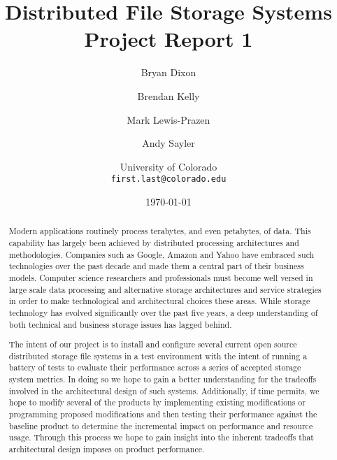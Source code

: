 \documentclass[11pt]{article}
\begin{document}
\title{
  Distributed File Storage Systems\\
  Project Report 1
}
\author{
  Bryan Dixon \and Brendan Kelly \and Mark Lewis-Prazen \and Andy Sayler\\
  \and University of Colorado\\
  \texttt{first.last@colorado.edu}
}
\date{\today}

\maketitle

\begin{abstract}
Modern applications routinely process
terabytes, and even petabytes, of data. This capability has largely been
achieved by distributed processing architectures and methodologies.
Companies such as Google, Amazon and Yahoo have embraced such
technologies over the past decade and made them a
central part of their business models. 
Computer science researchers and professionals must become well versed
in large scale data processing and alternative storage architectures
and service strategies in order to make technological and
architectural choices these areas. While storage technology has
evolved significantly over the past five years, a deep understanding
of both technical and business storage issues has lagged behind.

The intent of our project is to install and configure several current 
open source distributed storage file systems in a test environment 
with the intent of running a battery of tests to evaluate their 
performance across a series of accepted storage system metrics. In 
doing so we hope to gain a better understanding for the tradeoffs 
involved in the architectural design of such systems. Additionally, if
time permits, we hope to modify several of the products by implementing 
existing modifications or programming proposed modifications and then 
testing their performance against the baseline product to determine the
incremental impact on performance and resource usage. Through this 
process we hope to gain insight into the inherent tradeoffs that  
architectural design imposes on product performance.


\end{abstract}

\newpage
\end{document}
